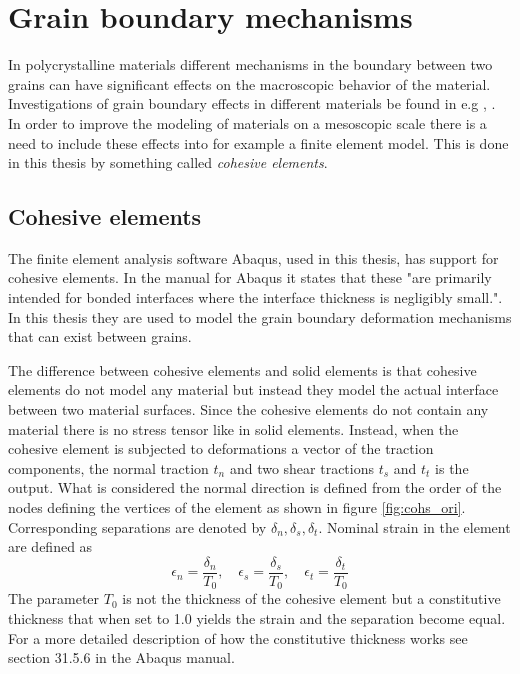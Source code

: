 \documentclass[grain_boundary_law.tex]{subfiles}
\begin{document}
\FloatBarrier

\chapter{Grain boundary mechanisms}


In polycrystalline materials different mechanisms in the boundary between two grains can have significant effects on the macroscopic behavior of the material. Investigations of grain boundary effects in different materials be found in e.g \cite{eff_grain}, \cite{grain_poly}. In order to improve the modeling of materials on a mesoscopic scale there is a need to include these effects into for example a finite element model. This is done in this thesis by something called \textit{cohesive elements}.

\section{Cohesive elements}

The finite element analysis software Abaqus, used in this thesis, has support for cohesive elements. In the manual for Abaqus it states that these "are primarily intended for bonded interfaces where the interface thickness is negligibly small.". In this thesis they are used to model the grain boundary deformation mechanisms that can exist between grains.

The difference between cohesive elements and solid elements is that cohesive elements do not model any material but instead they model the actual interface between two material surfaces. Since the cohesive elements do not contain any material there is no stress tensor like in solid elements. Instead, when the cohesive element is subjected to deformations a vector of the traction components, the normal traction $t_n$ and two shear tractions $t_s$ and $t_t$ is the output. What is considered the normal direction is defined from the order of the nodes defining the vertices of the element as shown in figure \ref{fig:cohs_ori}. Corresponding separations are denoted by $\delta_n, \delta_s, \delta_t$. Nominal strain in the element are defined as
%
\[ \epsilon_n = \frac{\delta_n}{T_0}, \quad \epsilon_s = \frac{\delta_s}{T_0}, \quad \epsilon_t = \frac{\delta_t}{T_0}  \]
%
The parameter $T_0$ is not the thickness of the cohesive element but a constitutive thickness that when set to 1.0 yields the strain and the separation become equal. For a more detailed description of how the constitutive thickness works see section 31.5.6 in the Abaqus manual.
\end{document}
